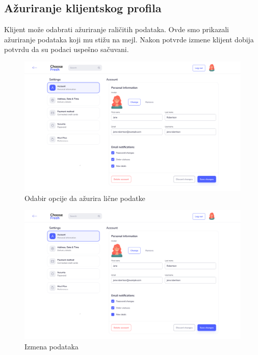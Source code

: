 \subsection{Ažuriranje klijentskog profila}

Klijent može odabrati ažuriranje raličitih podataka. Ovde smo prikazali ažuriranje podataka koji mu stižu na mejl. Nakon potvrde izmene klijent dobija potvrdu da su podaci uspešno sačuvani.

\begin{figure}[H]
	\begin{center}
		\includegraphics[width=\textwidth]{UI/account_settings.png}
    		\caption{Odabir opcije da ažurira lične podatke}
    \label{fig:AccountSettings}
    \end{center}
\end{figure}

\begin{figure}[H]
	\begin{center}
		\includegraphics[width=\textwidth]{UI/account_settings_update.png}
    		\caption{Izmena podataka}
    \label{fig:AccountSettingsUpdate}
    \end{center}
\end{figure}

